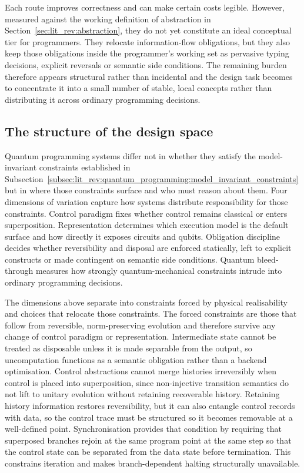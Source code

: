 Each route improves correctness and can make certain costs legible.
However, measured against the working definition of abstraction in Section~\ref{sec:lit_rev:abstraction}, they do not yet constitute an ideal conceptual tier for programmers.
They relocate information-flow obligations, but they also keep those obligations inside the programmer’s working set as pervasive typing decisions, explicit reversals or semantic side conditions.
The remaining burden therefore appears structural rather than incidental and the design task becomes to concentrate it into a small number of stable, local concepts rather than distributing it across ordinary programming decisions.

\subsection{The structure of the design space}\label{subsec:lit_rev:quantum_programming:design_space}
Quantum programming systems differ not in whether they satisfy the model-invariant constraints established in Subsection~\ref{subsec:lit_rev:quantum_programming:model_invariant_constraints} but in where those constraints surface and who must reason about them.
Four dimensions of variation capture how systems distribute responsibility for those constraints.
Control paradigm fixes whether control remains classical or enters superposition.
Representation determines which execution model is the default surface and how directly it exposes circuits and qubits.
Obligation discipline decides whether reversibility and disposal are enforced statically, left to explicit constructs or made contingent on semantic side conditions.
Quantum bleed-through measures how strongly quantum-mechanical constraints intrude into ordinary programming decisions.

The dimensions above separate into constraints forced by physical realisability and choices that relocate those constraints.
The forced constraints are those that follow from reversible, norm-preserving evolution and therefore survive any change of control paradigm or representation.
Intermediate state cannot be treated as disposable unless it is made separable from the output, so uncomputation functions as a semantic obligation rather than a backend optimisation.
Control abstractions cannot merge histories irreversibly when control is placed into superposition, since non-injective transition semantics do not lift to unitary evolution without retaining recoverable history.
Retaining history information restores reversibility, but it can also entangle control records with data, so the control trace must be structured so it becomes removable at a well-defined point.
Synchronisation provides that condition by requiring that superposed branches rejoin at the same program point at the same step so that the control state can be separated from the data state before termination.
This constrains iteration and makes branch-dependent halting structurally unavailable.

